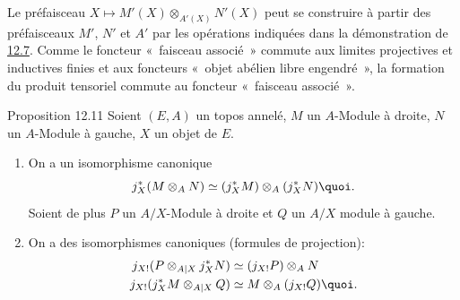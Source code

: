 Le préfaisceau $X\mapsto M'(X)\otimes_{A'(X)}N'(X)$ peut se
construire à partir des préfaisceaux $M'$, $N'$ et $A'$ par les
opérations indiquées dans la démonstration de \hyperref[IV.prop12.7]{12.7}.
Comme le foncteur « faisceau associé » commute aux limites
projectives et inductives finies et aux foncteurs « objet abélien
libre engendré », la formation du produit tensoriel commute au
foncteur « faisceau associé ».

\begin{enonce*}{Proposition 12.11}
Soient $(E,A)$ un topos annelé, $M$ un $A$-Module à droite, $N$ un
$A$-Module à gauche, $X$ un objet de $E$.
\begin{enumerate}
\renewcommand{\theenumi}{\alph{enumi}}
\renewcommand{\labelenumi}{\theenumi)}
\item On a un isomorphisme canonique
$$
j^{\ast}_X(M\otimes_A N)\simeq (j^{\ast}_XM)\otimes_A
(j^{\ast}_XN){\quoi}.
$$
Soient de plus $P$ un $A/X$-Module à droite et $Q$ un $A/X$ module à
gauche.

\item On a des isomorphismes canoniques (formules de projection):
\begin{align*}
j_{X!}(P\otimes_{A| X} j^{\ast}_XN) &\simeq (j_{X!}P)\otimes_A N\\
j_{X!}(j^{\ast}_XM\otimes_{A| X}Q) &\simeq M\otimes_A
(j_{X!}Q){\quoi}.
\end{align*}
\end{enumerate}
\end{enonce*}

